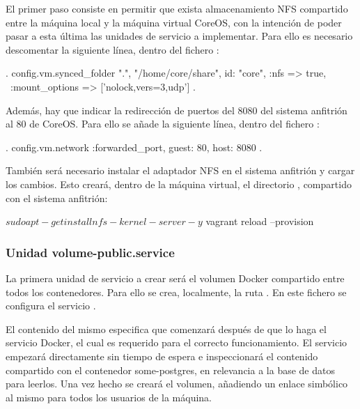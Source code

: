 El primer paso consiste en permitir que exista almacenamiento NFS compartido entre la máquina local y la máquina virtual CoreOS, con la intención de poder pasar a esta última las unidades de servicio a implementar. Para ello es necesario descomentar la siguiente línea, dentro del fichero :

\begin{codelisting}
\label{code:vagrantfile2}
\begin{code}
.
config.vm.synced_folder ".", "/home/core/share", id: "core", :nfs => true, \
:mount_options => ['nolock,vers=3,udp']
.
\end{code}
\end{codelisting}

Además, hay que indicar la redirección de puertos del 8080 del sistema anfitrión al 80 de CoreOS. Para ello se añade la siguiente línea, dentro del fichero :

\begin{codelisting}
\label{code:vagrantfile2}
\begin{code}
.
  config.vm.network :forwarded_port, guest: 80, host: 8080
.
\end{code}
\end{codelisting}

También será necesario instalar el adaptador NFS en el sistema anfitrión y cargar los cambios. Esto creará, dentro de la máquina virtual, el directorio , compartido con el sistema anfitrión:

\begin{code}
$ sudo apt-get install nfs-kernel-server -y
$ vagrant reload --provision
\end{code}

\subsubsection{Unidad volume-public.service}

La primera unidad de servicio a crear será el volumen Docker compartido entre todos los contenedores. Para ello se crea, localmente, la ruta . En este fichero se configura el servicio . 

El contenido del mismo especifica que comenzará después de que lo haga el servicio Docker, el cual es requerido para el correcto funcionamiento. El servicio empezará directamente sin tiempo de espera e inspeccionará el contenido compartido con el contenedor some-postgres, en relevancia a la base de datos para leerlos. Una vez hecho se creará el volumen, añadiendo un enlace simbólico al mismo para todos los usuarios de la máquina. 

